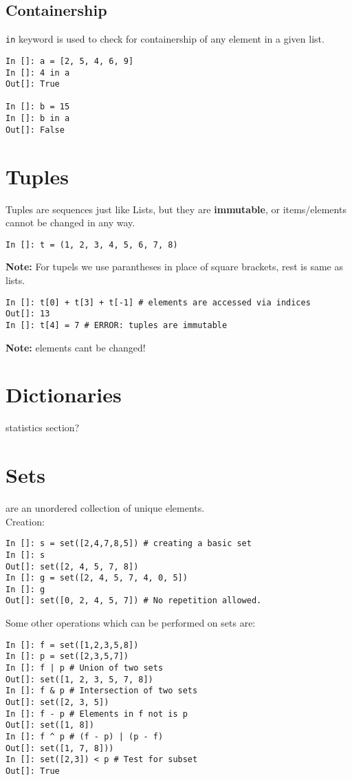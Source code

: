 \documentclass[12pt]{article}
\newcommand{\typ}[1]{\lstinline{#1}}
\begin{document}
\subsection{Containership}
\typ{in} keyword is used to check for containership of any element in a given list.
\begin{lstlisting}
In []: a = [2, 5, 4, 6, 9]
In []: 4 in a
Out[]: True

In []: b = 15
In []: b in a
Out[]: False
\end{lstlisting}
\section{Tuples}
Tuples are sequences just like Lists, but they are \textbf{immutable}, or items/elements cannot be changed in any way.
\begin{lstlisting}
In []: t = (1, 2, 3, 4, 5, 6, 7, 8) 
\end{lstlisting}
\textbf{Note:} For tupels we use parantheses in place of square brackets, rest is same as lists.
\begin{lstlisting}
In []: t[0] + t[3] + t[-1] # elements are accessed via indices
Out[]: 13
In []: t[4] = 7 # ERROR: tuples are immutable
\end{lstlisting}
\textbf{Note:} elements cant be changed!
\section{Dictionaries}
statistics section? 
\section{Sets}
are an unordered collection of unique elements.\\
Creation:
\begin{lstlisting}
In []: s = set([2,4,7,8,5]) # creating a basic set
In []: s
Out[]: set([2, 4, 5, 7, 8])
In []: g = set([2, 4, 5, 7, 4, 0, 5])
In []: g
Out[]: set([0, 2, 4, 5, 7]) # No repetition allowed.
\end{lstlisting}
Some other operations which can be performed on sets are:
\begin{lstlisting}
In []: f = set([1,2,3,5,8])
In []: p = set([2,3,5,7])
In []: f | p # Union of two sets
Out[]: set([1, 2, 3, 5, 7, 8])
In []: f & p # Intersection of two sets
Out[]: set([2, 3, 5])
In []: f - p # Elements in f not is p
Out[]: set([1, 8])
In []: f ^ p # (f - p) | (p - f)
Out[]: set([1, 7, 8])) 
In []: set([2,3]) < p # Test for subset
Out[]: True
\end{lstlisting}
\end{document}
